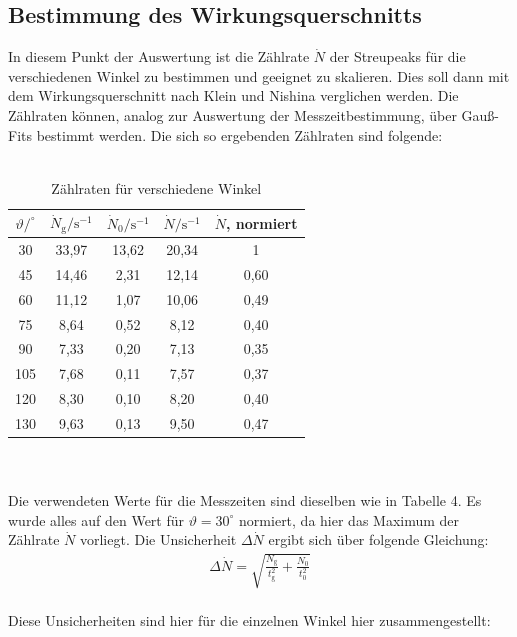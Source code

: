 \documentclass[german,  %
parskip=full,  %
]{scrartcl}
\begin{document}
\subsection{Bestimmung des Wirkungsquerschnitts}
In diesem Punkt der Auswertung ist die Zählrate $\dot{N}$ der Streupeaks für die verschiedenen Winkel zu bestimmen und geeignet zu skalieren. Dies soll dann mit dem Wirkungsquerschnitt nach Klein und Nishina verglichen werden. Die Zählraten können, analog zur Auswertung der Messzeitbestimmung, über Gauß-Fits bestimmt werden. Die sich so ergebenden Zählraten sind folgende:
\\\\
\begin{table}[h!]\centering
\begin{tabular}{|c|c|c|c|c|}\hline
$\vartheta/^{\circ}$  &  $\dot{N}_{\text{g}}/\text{s}^{-1}$ & $\dot{N}_{0}/\text{s}^{-1}$ & $\dot{N}/\text{s}^{-1}$ & $\dot{N}$, normiert \\\hline
30   & 33,97 & 13,62 & 20,34 & 1 		\\\hline
45   & 14,46 & 2,31 & 12,14 & 0,60		\\\hline
60   & 11,12 & 1,07 & 10,06 & 0,49 		\\\hline
75   & 8,64 	& 0,52  & 8,12 & 0,40 	\\\hline
90   & 7,33 & 0,20  & 7,13 & 0,35 	\\\hline
105 & 7,68	& 0,11 & 7,57 & 0,37 	\\\hline
120 & 8,30 & 0,10 & 8,20 & 0,40 		\\\hline
130 & 9,63 & 0,13 & 9,50 & 0,47 		\\\hline
\end{tabular}
\caption{Zählraten für verschiedene Winkel}
\end{table}
\\\\
Die verwendeten Werte für die Messzeiten sind dieselben wie in Tabelle 4. Es wurde alles auf den Wert für $\vartheta = 30^{\circ}$ normiert, da hier das Maximum der Zählrate $\dot{N}$ vorliegt.
Die Unsicherheit $\Delta \dot{N}$ ergibt sich über folgende Gleichung:
\begin{align}
\Delta \dot{N} = \sqrt{\frac{N_{\text{g}}}{t_{\text{g}}^2} + \frac{N_{0}}{t_{0}^2}}
\end{align}
\\
Diese Unsicherheiten sind hier für die einzelnen Winkel hier zusammengestellt:
\end{document}
